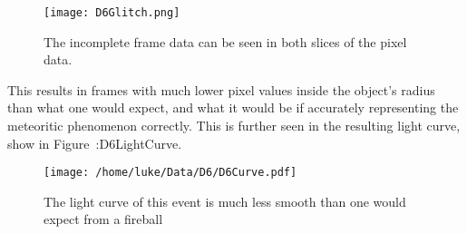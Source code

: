\begin{figure}[ht!]
	\centering
	\texttt{[image: D6Glitch.png]}
	\caption{The incomplete frame data can be seen in both slices of the pixel data.}
	\label{fig:D6Glitch}
\end{figure}

This results in frames with much lower pixel values inside the object's radius than what one would expect, and what it would be if accurately representing the meteoritic phenomenon correctly. This is further seen in the resulting light curve, show in Figure~:{D6LightCurve}.

\begin{figure}[ht!]
	\centering
	\texttt{[image: /home/luke/Data/D6/D6Curve.pdf]}
	\caption{The light curve of this event is much less smooth than one would expect from a fireball}
	\label{fig:D6LightCurve}
\end{figure}
